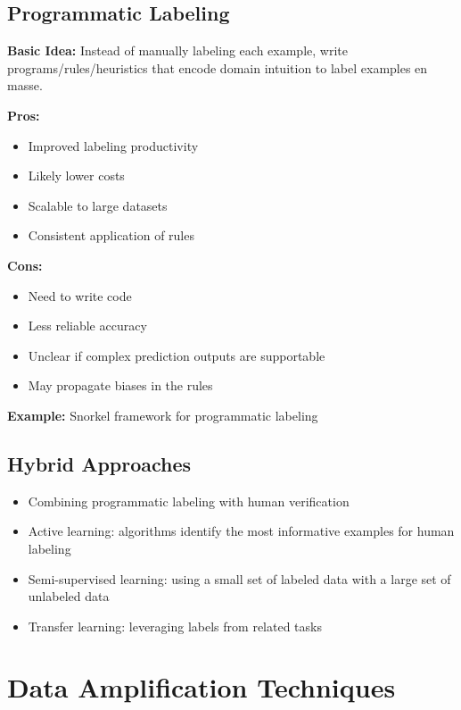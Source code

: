 \documentclass[12pt]{article}
\begin{document}
\subsection{Programmatic Labeling}
\begin{tcolorbox}[colback=green!5!white,colframe=green!75!black,title={Programmatic Labeling}]
\textbf{Basic Idea:} Instead of manually labeling each example, write programs/rules/heuristics that encode domain intuition to label examples en masse.

\textbf{Pros:}
\begin{itemize}
    \item Improved labeling productivity
    \item Likely lower costs
    \item Scalable to large datasets
    \item Consistent application of rules
\end{itemize}

\textbf{Cons:}
\begin{itemize}
    \item Need to write code
    \item Less reliable accuracy
    \item Unclear if complex prediction outputs are supportable
    \item May propagate biases in the rules
\end{itemize}

\textbf{Example:} Snorkel framework for programmatic labeling
\end{tcolorbox}

\subsection{Hybrid Approaches}
\begin{itemize}
    \item Combining programmatic labeling with human verification
    \item Active learning: algorithms identify the most informative examples for human labeling
    \item Semi-supervised learning: using a small set of labeled data with a large set of unlabeled data
    \item Transfer learning: leveraging labels from related tasks
\end{itemize}

\section{Data Amplification Techniques}
\end{document}
